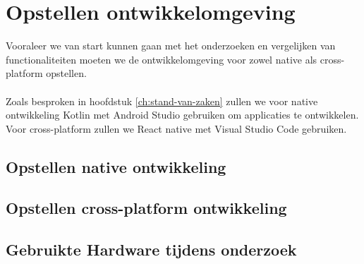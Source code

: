 
\chapter{Opstellen ontwikkelomgeving}%
\label{ch:ontwikkelomgeving}

Vooraleer we van start kunnen gaan met het onderzoeken en vergelijken van functionaliteiten 
moeten we de ontwikkelomgeving voor zowel native als cross-platform opstellen. 
\\\\
Zoals besproken in hoofdstuk \ref{ch:stand-van-zaken} zullen we voor native ontwikkeling Kotlin 
met Android Studio gebruiken om applicaties te ontwikkelen. Voor cross-platform zullen we React native 
met Visual Studio Code gebruiken.

\section{Opstellen native ontwikkeling}\label{se:native}



\section{Opstellen cross-platform ontwikkeling}



\section{Gebruikte Hardware tijdens onderzoek}












